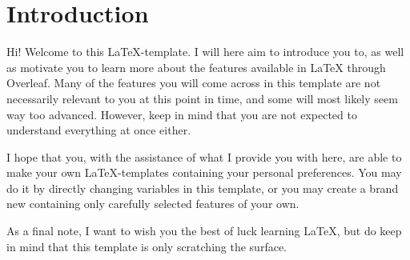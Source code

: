 \section{Introduction}

Hi! 
Welcome to this \LaTeX-template. I will here aim to introduce you to, as well as motivate you to learn more about the features available in LaTeX through Overleaf. Many of the features you will come across in this template are not necessarily relevant to you at this point in time, and some will most likely seem way too advanced. However, keep in mind that you are not expected to understand everything at once either.

I hope that you, with the assistance of what I provide you with here, are able to make your own LaTeX-templates containing your personal preferences. You may do it by directly changing variables in this template, or you may create a brand new containing only carefully selected features of your own. 

As a final note, I want to wish you the best of luck learning LaTeX, but do keep in mind that this template is only scratching the surface.

\nocite{imt_software_wiki}  %